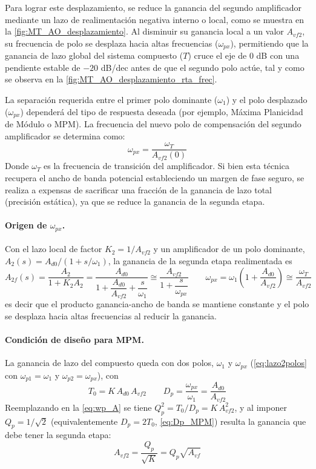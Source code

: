 Para lograr este desplazamiento, se reduce la ganancia del segundo amplificador mediante un lazo de realimentación negativa interno o local, como se muestra en la \autoref{fig:MT_AO_desplazamiento}. Al disminuir su ganancia local a un valor $A_{vf2}$, su frecuencia de polo se desplaza hacia altas frecuencias ($\omega_{px}$), permitiendo que la ganancia de lazo global del sistema compuesto ($T$) cruce el eje de 0 dB con una pendiente estable de $-20$ dB/dec antes de que el segundo polo actúe, tal y como se observa en la \autoref{fig:MT_AO_desplazamiento_rta_frec}.


La separación requerida entre el primer polo dominante ($\omega_1$) y el polo desplazado ($\omega_{px}$) dependerá del tipo de respuesta deseada (por ejemplo, Máxima Planicidad de Módulo o MPM). La frecuencia del nuevo polo de compensación del segundo amplificador se determina como:
\begin{equation}
\omega_{px} = \frac{\omega_T}{A_{vf2}(0)}
\label{eq:wpx}
\end{equation}
Donde $\omega_T$ es la frecuencia de transición del amplificador. Si bien esta técnica recupera el ancho de banda potencial estableciendo un margen de fase seguro, se realiza a expensas de sacrificar una fracción de la ganancia de lazo total (precisión estática), ya que se reduce la ganancia de la segunda etapa.

\paragraph{Origen de $\omega_{px}$.} Con el lazo local de factor $K_2 = 1/A_{vf2}$ y un amplificador de un polo dominante, $A_2(s) = A_{d0}/(1+s/\omega_1)$, la ganancia de la segunda etapa realimentada es
\begin{equation}
    A_{2f}(s) = \frac{A_2}{1+K_2 A_2} = \frac{A_{d0}}{1 + \dfrac{A_{d0}}{A_{vf2}} + \dfrac{s}{\omega_1}} \cong \frac{A_{vf2}}{1 + \dfrac{s}{\omega_{px}}} \qquad \omega_{px} = \omega_1\left(1 + \frac{A_{d0}}{A_{vf2}}\right) \cong \frac{\omega_T}{A_{vf2}}
    \label{eq:A2f}
\end{equation}
es decir que el producto ganancia-ancho de banda se mantiene constante y el polo se desplaza hacia altas frecuencias al reducir la ganancia.

\paragraph{Condición de diseño para MPM.} La ganancia de lazo del compuesto queda con dos polos, $\omega_1$ y $\omega_{px}$ (\autoref{eq:lazo2polos} con $\omega_{p1} = \omega_1$ y $\omega_{p2} = \omega_{px}$), con
\begin{equation}
    T_0 = K\,A_{d0}\,A_{vf2} \qquad D_p = \frac{\omega_{px}}{\omega_1} = \frac{A_{d0}}{A_{vf2}}
\end{equation}
Reemplazando en la \autoref{eq:wp_A} se tiene $Q_p^2 = T_0/D_p = K\,A_{vf2}^2$, y al imponer $Q_p = 1/\sqrt{2}$ (equivalentemente $D_p = 2T_0$, \autoref{eq:Dp_MPM}) resulta la ganancia que debe tener la segunda etapa:
\begin{equation}
    A_{vf2} = \frac{Q_p}{\sqrt{K}} = Q_p\sqrt{A_{vf}}
    \label{eq:Avf2_MPM}
\end{equation}
